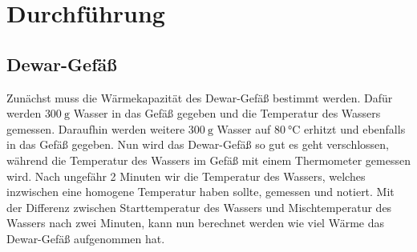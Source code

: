 \section{Durchführung}
\label{sec:Durchführung}

\subsection{Dewar-Gefäß}
Zunächst muss die Wärmekapazität des Dewar-Gefäß bestimmt werden.
Dafür werden $\SI{300}{\gram}$ Wasser in das Gefäß gegeben und die Temperatur des Wassers gemessen.
Daraufhin werden weitere $\SI{300}{\gram}$ Wasser auf $\SI{80}{\celsius}$ erhitzt und ebenfalls in das Gefäß gegeben.
Nun wird das Dewar-Gefäß so gut es geht verschlossen, während die Temperatur des Wassers im Gefäß mit einem Thermometer gemessen wird.
Nach ungefähr 2 Minuten wir die Temperatur des Wassers, welches inzwischen eine homogene Temperatur haben sollte, gemessen und notiert.
Mit der Differenz zwischen Starttemperatur des Wassers und Mischtemperatur des Wassers nach zwei Minuten, kann nun berechnet werden wie viel Wärme das Dewar-Gefäß aufgenommen hat.

